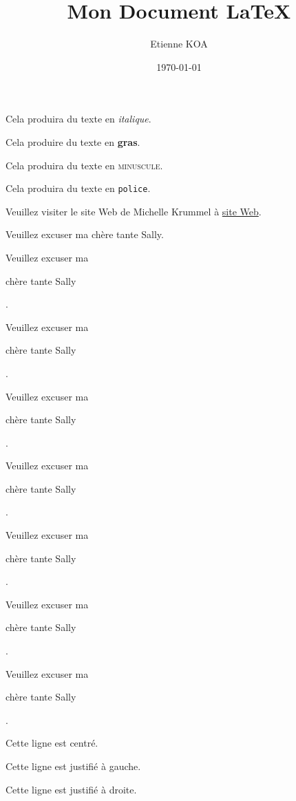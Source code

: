 \documentclass[11pt]{article}
\title{Mon Document {\LaTeX}}
\author{Etienne KOA}
\date{\today}
\begin{document}
\tableofcontents
\maketitle

Cela produira du texte en \textit{italique}.

Cela produire du texte en \textbf{gras}.

Cela produira du texte en \textsc{minuscule}.

Cela produira du texte en \texttt{police}.

Veuillez visiter le site Web de Michelle Krummel à \href{http://michellekrummel.com}{site Web}.

\vspace{1cm}

Veuillez excuser ma chère tante Sally.

Veuillez excuser ma \begin{Large} chère tante Sally \end{Large}.

Veuillez excuser ma \begin{Huge} chère tante Sally \end{Huge}.

Veuillez excuser ma \begin{Huge} chère tante Sally \end{Huge}.

Veuillez excuser ma \begin{normalsize} chère tante Sally \end{normalsize}.

Veuillez excuser ma \begin{small} chère tante Sally \end{small}.

Veuillez excuser ma \begin{scriptsize}chère tante Sally \end{scriptsize}.

Veuillez excuser ma \begin{tiny} chère tante Sally \end{tiny}.

\vspace{1cm}

\begin{center} Cette ligne est centré.\end{center}
\begin{flushleft} Cette ligne est justifié à gauche.\end{flushleft}
\begin{flushright} Cette ligne est justifié à droite.\end{flushright}
\end{document}
